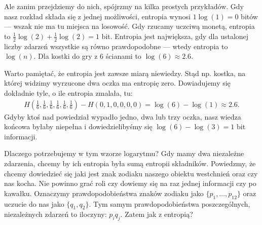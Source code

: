 \documentclass[10pt,a4paper]{article}
\begin{document}
Ale zanim przejdziemy do nich, spójrzmy na kilka prostych przykładów.
Gdy nasz rozkład składa się z jednej możliwości, entropia wynosi $1 \log(1) = 0$ bitów --- wszak nie ma tu miejsca na losowość.
Gdy rzucamy uczciwą monetą, entropia to $\tfrac{1}{2} \log(2) + \tfrac{1}{2} \log(2) = 1$ bit.
Entropia jest największa, gdy dla ustalonej liczby zdarzeń wszystkie są równo prawdopodobne --- wtedy entropia to $\log(n)$.
Dla kostki do gry z $6$ ścianami to $\log(6)\approx 2.6$.
%

Warto pamiętać, że entropia jest zawsze miarą niewiedzy.
Stąd np. kostka, na której widzimy wyrzucone dwa oczka ma entropię zero.
Dowiadujemy się dokładnie tyle, o ile entropia zmalała, tu:
%
\begin{align}
    H(\tfrac{1}{6}, \tfrac{1}{6}, \tfrac{1}{6}, \tfrac{1}{6}, \tfrac{1}{6}, \tfrac{1}{6})
    - H(0, 1, 0, 0, 0, 0) = \log(6) - \log(1)
    \approx 2.6.
\end{align}
%
Gdyby ktoś nad powiedział wypadło jedno, dwa lub trzy oczka, nasz wiedza końcowa byłaby niepełna i dowiedzielibyśmy się $\log(6) - \log(3) = 1 $ bit informacji.




Dlaczego potrzebujemy w tym wzorze logarytmu? 
Gdy mamy dwa niezależne zdarzenia, chcemy by ich entropia była sumą entropii składników.
Powiedzmy, że chcemy dowiedzieć się jaki jest znak zodiaku naszego obiektu westchnień oraz czy nas kocha.
Nie powinno grać roli czy dowiemy się na raz jednej informacji czy po kawałku.
Oznaczymy prawdopodobieństwa znaków zodiaku jako $\{p_1, \ldots, p_{12} \}$ oraz uczucie do nas jako $\{q_1, q_2\}$.
Tym samym prawdopodobieństwa poszczególnych, niezależnych zdarzeń to iloczyny: $p_i q_j$.
Zatem jak z entropią?
%
%
\end{document}
